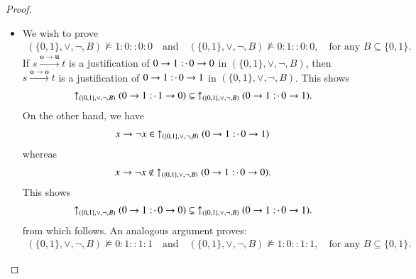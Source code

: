 \documentclass[11pt]{amsart}
\theoremstyle{definition} %
\newcommand{\righttherefore}{:\joinrel\cdot\,}
\begin{document}
\begin{proof}
\begin{itemize}
	\item We wish to prove
	\begin{align}\label{equ:lor_neg_1000_0100} 
		(\{0,1\},\lor,\neg,B)\not\models 1:0::0:0 \quad\text{and}\quad (\{0,1\},\lor,\neg,B)\not\models 0:1::0:0,\quad\text{for any $B\subseteq\{0,1\}$}.
	\end{align} If $s\xrightarrow{\mathbf o\to\mathbf u} t$ is a justification of $0\to 1\righttherefore 0\to 0$ in $(\{0,1\},\lor,\neg,B)$, then $s\xrightarrow{\mathbf o\to\mathbf o} t$ is a justification of $0\to 1\righttherefore 0\to 1$ in $(\{0,1\},\lor,\neg,B)$. This shows
	\begin{align*} 
		\uparrow_{(\{0,1\},\lor,\neg,B)}(0\to 1\righttherefore 1\to 0)\subseteq\ \uparrow_{(\{0,1\},\lor,\neg,B)}(0\to 1\righttherefore 0\to 1).
	\end{align*} On the other hand, we have
	\begin{align*} 
		x\to\neg x\in\ \uparrow_{(\{0,1\},\lor,\neg,B)}(0\to 1\righttherefore 0\to 1)
	\end{align*} whereas
	\begin{align*} 
		x\to\neg x\not\in\ \uparrow_{(\{0,1\},\lor,\neg,B)}(0\to 1\righttherefore 0\to 0).
	\end{align*} This shows
	\begin{align*} 
		\uparrow_{(\{0,1\},\lor,\neg,B)}(0\to 1\righttherefore 0\to 0)\subsetneq\ \uparrow_{(\{0,1\},\lor,\neg,B)}(0\to 1\righttherefore 0\to 1).
	\end{align*} from which  follows. An analogous argument proves:
	\begin{align}\label{equ:lor_neg_0111_1011} 
		(\{0,1\},\lor,\neg,B)\not\models 0:1::1:1 \quad\text{and}\quad (\{0,1\},\lor,\neg,B)\not\models 1:0::1:1,\quad\text{for any $B\subseteq\{0,1\}$}. 
	\end{align}


\end{itemize}
\end{proof}
\end{document}
